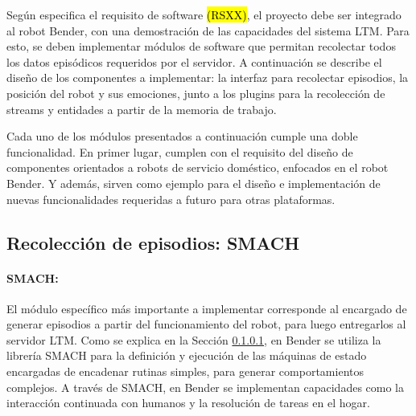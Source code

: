 Según especifica el requisito de software \hl{(RSXX)}, el proyecto debe ser integrado al robot Bender, con una demostración de las capacidades del sistema LTM. Para esto, se deben implementar módulos de software que permitan recolectar todos los datos episódicos requeridos por el servidor. A continuación se describe el diseño de los componentes a implementar: la interfaz para recolectar episodios, la posición del robot y sus emociones, junto a los plugins para la recolección de streams y entidades a partir de la memoria de trabajo. 

Cada uno de los módulos presentados a continuación cumple una doble funcionalidad. En primer lugar, cumplen con el requisito del diseño de componentes orientados a robots de servicio doméstico, enfocados en el robot Bender. Y además, sirven como ejemplo para el diseño e implementación de nuevas funcionalidades requeridas a futuro para otras plataformas.

\subsection{Recolección de episodios: SMACH}

\paragraph{SMACH:}
El módulo específico más importante a implementar corresponde al encargado de generar episodios a partir del funcionamiento del robot, para luego entregarlos al servidor LTM. Como se explica en la Sección \ref{}, en Bender se utiliza la librería SMACH para la definición y ejecución de las máquinas de estado encargadas de encadenar rutinas simples, para generar comportamientos complejos. A través de SMACH, en Bender se implementan capacidades como la interacción continuada con humanos y la resolución de tareas en el hogar. 

